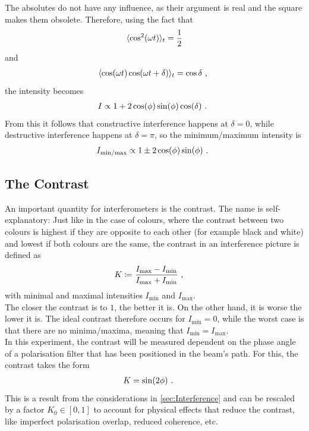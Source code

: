 The absolutes do not have any influence, as their argument is real and the square makes them obsolete. Therefore, using the fact that 
\begin{align}
  \langle \cos^2(\omega t)\rangle_t = \frac{1}{2}
\end{align}
and \begin{align}
  \langle \cos(\omega t)\cos(\omega t + \delta)\rangle_t = \cos{\delta} \text{ , }
\end{align}
the intensity becomes 
\begin{align}
  I \propto 1 + 2 \cos(\phi)\sin(\phi) \cos(\delta) \text{ . }
\end{align}
From this it follows that constructive interference happens at $\delta = 0$, while destructive interference happens at $\delta = \pi$, so the minimum/maximum intensity is 
\begin{align}
  I_\text{min/max} \propto 1 \pm 2 \cos(\phi)\sin(\phi) \text{ . }
\end{align}


\subsection{The Contrast}
An important quantity for interferometers is the contrast. The name is self-explanatory: Just like in the case of colours, where the contrast between two colours is highest if they are opposite to each other (for example black and white) and lowest if both colours are the same, the contrast in an interference picture is defined as 
\begin{align}
  K &\coloneqq \frac{I_\text{max}-I_\text{min}}{I_\text{max} + I_\text{min}} \text{ , }
  \label{eq:contrast}
\end{align}
with minimal and maximal intensities $I_\text{min}$ and $I_\text{max}$.\\
The closer the contrast is to $1$, the better it is. On the other hand, it is worse the lower it is. The ideal contrast therefore occurs for $I_\text{min}=0$, while the worst case is that there are no minima/maxima, meaning that $I_\text{min}=I_\text{max}$.\\
In this experiment, the contrast will be measured dependent on the phase angle of a polarisation filter that has been positioned in the beam's path. For this, the contrast takes the form 
\begin{align}
  \label{eq:contrast}
K &= \sin(2\phi) \text{ . }
\end{align}
This is a result from the considerations in \autoref{sec:Interference} and can be rescaled by a factor $K_0 \in [0,1]$ to account for physical effects that reduce the contrast, like imperfect polarisation overlap, reduced coherence, etc.


